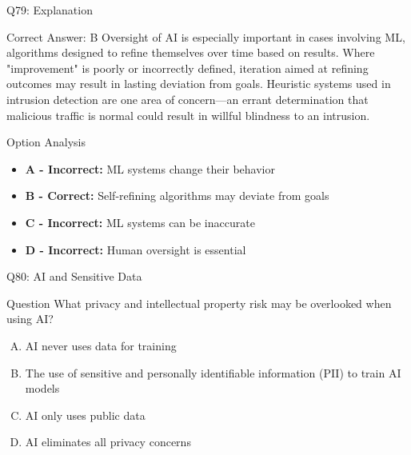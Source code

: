 \documentclass{beamer}
\begin{document}
	\begin{frame}{Q79: Explanation}
		\begin{block}{Correct Answer: B}
			Oversight of AI is especially important in cases involving ML, algorithms designed to refine themselves over time based on results. Where "improvement" is poorly or incorrectly defined, iteration aimed at refining outcomes may result in lasting deviation from goals. Heuristic systems used in intrusion detection are one area of concern—an errant determination that malicious traffic is normal could result in willful blindness to an intrusion.
		\end{block}
		\begin{block}{Option Analysis}
			\begin{itemize}
				\item \textbf{A - Incorrect:} ML systems change their behavior
				\item \textbf{B - Correct:} Self-refining algorithms may deviate from goals
				\item \textbf{C - Incorrect:} ML systems can be inaccurate
				\item \textbf{D - Incorrect:} Human oversight is essential
			\end{itemize}
		\end{block}
	\end{frame}
	
	\begin{frame}{Q80: AI and Sensitive Data}
		\begin{block}{Question}
			What privacy and intellectual property risk may be overlooked when using AI?
		\end{block}
		\begin{enumerate}[(A)]
			\item AI never uses data for training
			\item The use of sensitive and personally identifiable information (PII) to train AI models
			\item AI only uses public data
			\item AI eliminates all privacy concerns
		\end{enumerate}
	\end{frame}
	
\end{document}
